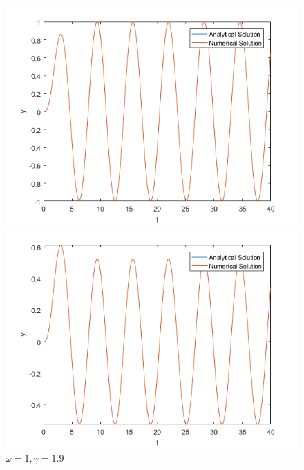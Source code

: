 \documentclass[10pt,a4paper]{report}
\begin{document}
\begin{figure}[ht]
\begin{minipage}[b]{0.5\linewidth}
\centering
\includegraphics[width=\textwidth]{q7w1g1.png}
\caption{$\omega=1, \gamma=1$}
\label{fig:figure1}
\end{minipage}
\hspace{0.5cm}
\begin{minipage}[b]{0.5\linewidth}
\centering
\includegraphics[width=\textwidth]{q7w1g19.png}
\caption{$\omega=1, \gamma=1.9$}
\label{fig:figure2}
\end{minipage}
\end{figure}
\end{document}
